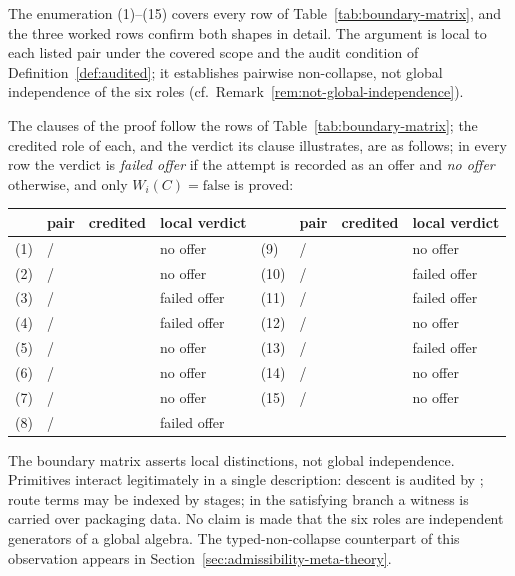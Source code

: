 The enumeration (1)--(15) covers every row of
Table~\ref{tab:boundary-matrix}, and the three worked rows confirm both shapes
in detail. The argument is local to each listed pair under the covered scope and
the audit condition of Definition~\ref{def:audited}; it establishes pairwise
non-collapse, not global independence of the six roles (cf.\
Remark~\ref{rem:not-global-independence}).

The clauses of the proof follow the rows of Table~\ref{tab:boundary-matrix};
the credited role of each, and the verdict its clause illustrates, are as follows; in every row the verdict is \emph{failed offer} if the attempt is recorded as an offer and \emph{no offer} otherwise, and only \(W_i(C)=\mathrm{false}\) is proved:
\begin{center}
\footnotesize
\begin{tabular}{@{}llll@{\qquad}llll@{}}
\toprule
& pair & credited & local verdict & & pair & credited & local verdict \\
\midrule
(1) & \Pone{}/\Pfive{} & \Pone{} & no offer & (9) & \Ptwo{}/\Psix{} & \Ptwo{} & no offer \\
(2) & \Pone{}/\Pfour{} & \Pone{} & no offer & (10) & \Pthree{}/\Pfour{} & \Pfour{} & failed offer \\
(3) & \Pone{}/\Ptwo{} & \Pone{} & failed offer & (11) & \Pthree{}/\Pfive{} & \Pthree{} & failed offer \\
(4) & \Pone{}/\Pthree{} & \Pthree{} & failed offer & (12) & \Pthree{}/\Psix{} & \Pthree{} & no offer \\
(5) & \Pone{}/\Psix{} & \Pone{} & no offer & (13) & \Pfour{}/\Pfive{} & \Pfour{} & failed offer \\
(6) & \Ptwo{}/\Pfive{} & \Ptwo{} & no offer & (14) & \Pfour{}/\Psix{} & \Pfour{} & no offer \\
(7) & \Ptwo{}/\Pfour{} & \Ptwo{} & no offer & (15) & \Pfive{}/\Psix{} & \Pfive{} & no offer \\
(8) & \Ptwo{}/\Pthree{} & \Pthree{} & failed offer & & & & \\
\bottomrule
\end{tabular}
\end{center}

\begin{remark}[Not a global independence theorem]\label{rem:not-global-independence}
The boundary matrix asserts local distinctions, not global
independence. Primitives interact legitimately in a single
description: \Pone{} descent is audited by \Psix{}; \Pthree{} route
terms may be indexed by \Pfour{} stages; in the satisfying branch a
\Ptwo{} witness is carried over \Pfive{} packaging data.
No claim is made that the six roles are independent generators of a
global algebra. The typed-non-collapse counterpart of this observation
appears in Section~\ref{sec:admissibility-meta-theory}.
\end{remark}

